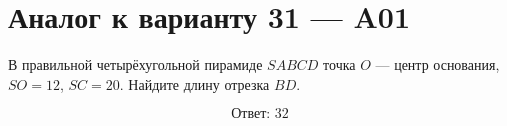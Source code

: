 \documentclass[12pt,a4paper]{article}
\begin{document}
\section*{Аналог к варианту 31 — A01}

В правильной четырёхугольной пирамиде \(SABCD\) точка \(O\) — центр основания, \(SO=12\), \(SC=20\). Найдите длину отрезка \(BD\).

\begin{center}
\end{center}

\[
\boxed{\text{Ответ: }32}
\]
\end{document}
